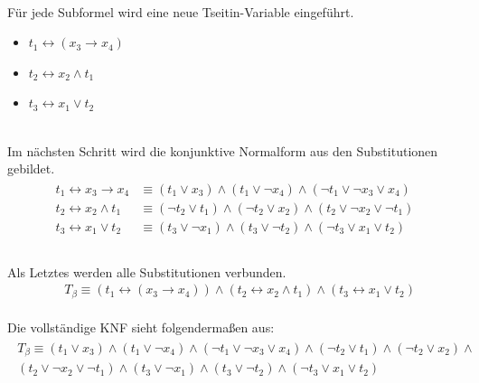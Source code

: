 \documentclass[a4,abstract=on]{scrartcl}
\begin{document}
\ \\
Für jede Subformel wird eine neue Tseitin-Variable eingeführt.\\
\begin{itemize}
\item $t_1 \leftrightarrow (x_3 \rightarrow x_4)$
\item $t_2 \leftrightarrow x_2 \wedge t_1$
\item $t_3 \leftrightarrow x_1 \vee t_2$
\end{itemize}
\ \\
Im nächsten Schritt wird die konjunktive Normalform aus den Substitutionen gebildet.\\
\begin{align*}
\begin{aligned}
t_1 \leftrightarrow x_3 \rightarrow x_4 &\equiv (t_1 \vee  x_3) \wedge (t_1 \vee \neg x_4) \wedge (\neg t_1 \vee \neg x_3 \vee x_4)\\
t_2 \leftrightarrow x_2 \wedge t_1 &\equiv (\neg t_2 \vee  t_1) \wedge (\neg t_2 \vee x_2) \wedge (t_2 \vee \neg x_2 \vee \neg t_1)\\
t_3 \leftrightarrow x_1 \vee t_2 &\equiv (t_3 \vee  \neg x_1) \wedge (t_3 \vee \neg t_2) \wedge (\neg t_3 \vee x_1 \vee t_2)\\
\end{aligned}
\end{align*}
\ \\
Als Letztes werden alle Substitutionen verbunden.\\
\begin{align*}
& T_\beta \equiv(t_1 \leftrightarrow (x_3 \rightarrow x_4)) \wedge (t_2 \leftrightarrow x_2 \wedge t_1) \wedge (t_3 \leftrightarrow x_1 \vee t_2)
\end{align*}
\ \\
Die vollständige KNF sieht folgendermaßen aus:\\
\begin{align*}
\begin{aligned}
T_\beta \equiv (t_1 \vee  x_3) \wedge (t_1 \vee \neg x_4) \wedge (\neg t_1 \vee \neg x_3 \vee x_4) \wedge (\neg t_2 \vee  t_1) \wedge (\neg t_2 \vee x_2) \wedge \\
(t_2 \vee \neg x_2 \vee \neg t_1) \wedge (t_3 \vee  \neg x_1) \wedge (t_3 \vee \neg t_2) \wedge (\neg t_3 \vee x_1 \vee t_2)
\end{aligned}
\end{align*}
\end{document}
